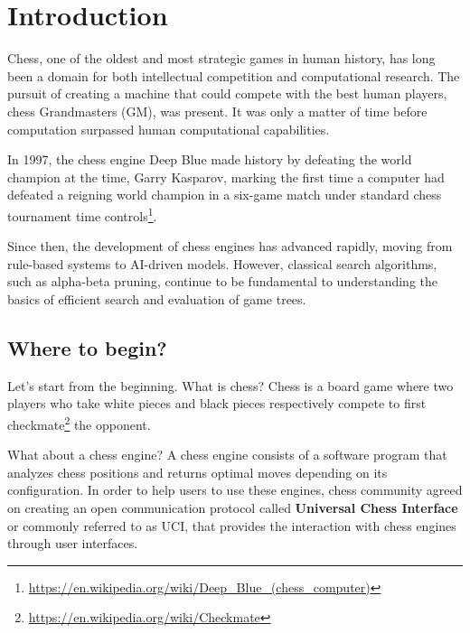 \chapter{Introduction}
\label{cap:introduction}
\renewcommand{\figurename}{Figure}


Chess, one of the oldest and most strategic games in human history, has long been a domain for both intellectual competition and computational research. The pursuit of creating a machine that could compete with the best human players, chess Grandmasters (GM), was present. It was only a matter of time before computation surpassed human computational capabilities.

\vspace{1em}

In 1997, the chess engine Deep Blue made history by defeating the world champion at the time, Garry Kasparov, marking the first time a computer had defeated a reigning world champion in a six-game match under standard chess tournament time controls\footnote{\url{https://en.wikipedia.org/wiki/Deep_Blue_(chess_computer)}}.

\vspace{1em}

Since then, the development of chess engines has advanced rapidly, moving from rule-based systems to AI-driven models. However, classical search algorithms, such as alpha-beta pruning, continue to be fundamental to understanding the basics of efficient search and evaluation of game trees.


\section{Where to begin?}

Let's start from the beginning. What is chess? Chess is a board game where two players who take white pieces and black pieces respectively compete to first checkmate\footnote{\url{https://en.wikipedia.org/wiki/Checkmate}} the opponent.

\vspace{1em}

What about a chess engine? A chess engine consists of a software program that analyzes chess positions and returns optimal moves depending on its configuration. In order to help users to use these engines, chess community agreed on creating an open communication protocol called \textbf{Universal Chess Interface} or commonly referred to as UCI, that provides the interaction with chess engines through user interfaces.

